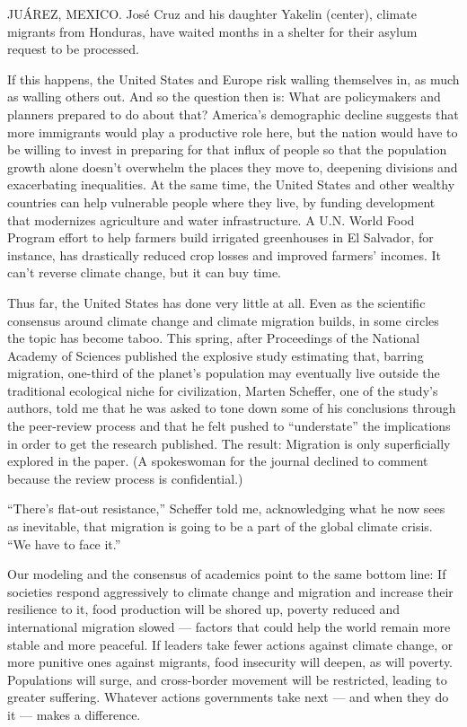 JUÁREZ, MEXICO. José Cruz and his daughter Yakelin (center), climate
migrants from Honduras, have waited months in a shelter for their asylum
request to be processed.

If this happens, the United States and Europe risk walling themselves
in, as much as walling others out. And so the question then is: What are
policymakers and planners prepared to do about that? America's
demographic decline suggests that more immigrants would play a
productive role here, but the nation would have to be willing to invest
in preparing for that influx of people so that the population growth
alone doesn't overwhelm the places they move to, deepening divisions and
exacerbating inequalities. At the same time, the United States and other
wealthy countries can help vulnerable people where they live, by funding
development that modernizes agriculture and water infrastructure. A U.N.
World Food Program effort to help farmers build irrigated greenhouses in
El Salvador, for instance, has drastically reduced crop losses and
improved farmers' incomes. It can't reverse climate change, but it can
buy time.

Thus far, the United States has done very little at all. Even as the
scientific consensus around climate change and climate migration builds,
in some circles the topic has become taboo. This spring, after
Proceedings of the National Academy of Sciences published the explosive
study estimating that, barring migration, one-third of the planet's
population may eventually live outside the traditional ecological niche
for civilization, Marten Scheffer, one of the study's authors, told me
that he was asked to tone down some of his conclusions through the
peer-review process and that he felt pushed to ``understate'' the
implications in order to get the research published. The result:
Migration is only superficially explored in the paper. (A spokeswoman
for the journal declined to comment because the review process is
confidential.)

``There's flat-out resistance,'' Scheffer told me, acknowledging what he
now sees as inevitable, that migration is going to be a part of the
global climate crisis. ``We have to face it.''

Our modeling and the consensus of academics point to the same bottom
line: If societies respond aggressively to climate change and migration
and increase their resilience to it, food production will be shored up,
poverty reduced and international migration slowed --- factors that
could help the world remain more stable and more peaceful. If leaders
take fewer actions against climate change, or more punitive ones against
migrants, food insecurity will deepen, as will poverty. Populations will
surge, and cross-border movement will be restricted, leading to greater
suffering. Whatever actions governments take next --- and when they do
it --- makes a difference.

